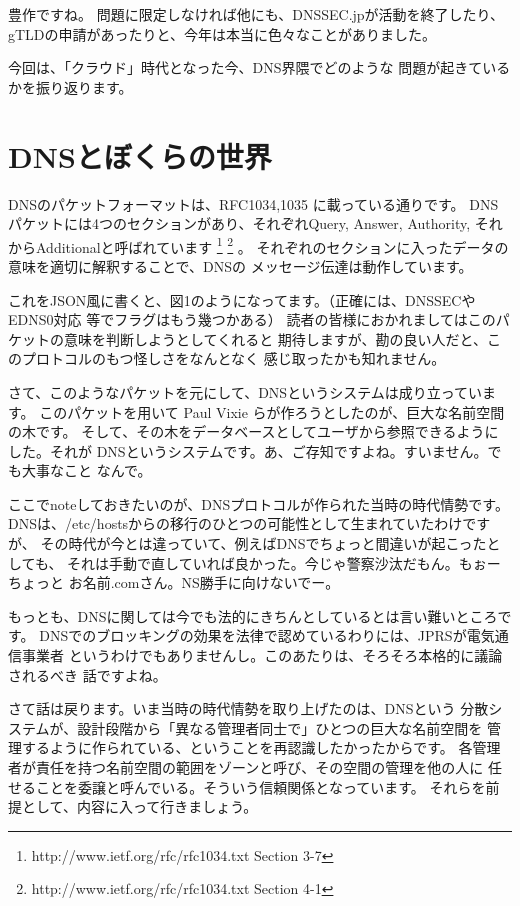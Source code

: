 豊作ですね。
問題に限定しなければ他にも、DNSSEC.jpが活動を終了したり、
gTLDの申請があったりと、今年は本当に色々なことがありました。

今回は、「クラウド」時代となった今、DNS界隈でどのような
問題が起きているかを振り返ります。

\section{DNSとぼくらの世界}

DNSのパケットフォーマットは、RFC1034,1035 に載っている通りです。
DNSパケットには4つのセクションがあり、それぞれQuery, Answer, Authority,
それからAdditionalと呼ばれています
\footnote{http://www.ietf.org/rfc/rfc1034.txt Section 3-7}
\footnote{http://www.ietf.org/rfc/rfc1034.txt Section 4-1}
。
それぞれのセクションに入ったデータの意味を適切に解釈することで、DNSの
メッセージ伝達は動作しています。

これをJSON風に書くと、図1のようになってます。（正確には、DNSSECやEDNS0対応
等でフラグはもう幾つかある）
読者の皆様におかれましてはこのパケットの意味を判断しようとしてくれると
期待しますが、勘の良い人だと、このプロトコルのもつ怪しさをなんとなく
感じ取ったかも知れません。

さて、このようなパケットを元にして、DNSというシステムは成り立っています。
このパケットを用いて Paul Vixie らが作ろうとしたのが、巨大な名前空間の木です。
そして、その木をデータベースとしてユーザから参照できるようにした。それが
DNSというシステムです。あ、ご存知ですよね。すいません。でも大事なこと
なんで。

ここでnoteしておきたいのが、DNSプロトコルが作られた当時の時代情勢です。
DNSは、/etc/hostsからの移行のひとつの可能性として生まれていたわけですが、
その時代が今とは違っていて、例えばDNSでちょっと間違いが起こったとしても、
それは手動で直していれば良かった。今じゃ警察沙汰だもん。もぉーちょっと
お名前.comさん。NS勝手に向けないでー。

もっとも、DNSに関しては今でも法的にきちんとしているとは言い難いところです。
DNSでのブロッキングの効果を法律で認めているわりには、JPRSが電気通信事業者
というわけでもありませんし。このあたりは、そろそろ本格的に議論されるべき
話ですよね。

さて話は戻ります。いま当時の時代情勢を取り上げたのは、DNSという
分散システムが、設計段階から「異なる管理者同士で」ひとつの巨大な名前空間を
管理するように作られている、ということを再認識したかったからです。
各管理者が責任を持つ名前空間の範囲をゾーンと呼び、その空間の管理を他の人に
任せることを委譲と呼んでいる。そういう信頼関係となっています。
それらを前提として、内容に入って行きましょう。


